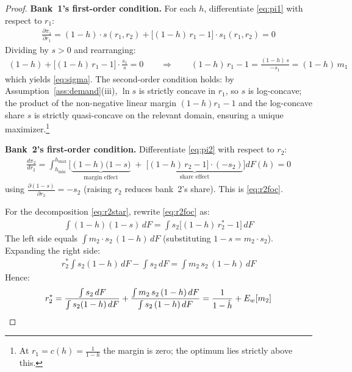 \documentclass[12pt]{article}
\theoremstyle{plain}
\theoremstyle{plain}
\theoremstyle{definition}  %
\theoremstyle{remark}  %
\begin{document}
\begin{proof}
\textbf{Bank~1's first-order condition.} For each $h$, differentiate \eqref{eq:pi1} with respect to $r_1$:
\begin{align*}
    \frac{\partial \pi_1}{\partial r_1} = (1-h) \cdot s(r_1, r_2) + \big[(1-h)\,r_1 - 1\big] \cdot s_1(r_1, r_2) = 0
\end{align*}
Dividing by $s > 0$ and rearranging:
\begin{align*}
    (1-h) + \big[(1-h)\,r_1 - 1\big] \cdot \frac{s_1}{s} = 0 \qquad\Longrightarrow\qquad (1-h)\,r_1 - 1 = \frac{(1-h)\, s}{-s_1} = (1-h)\, m_1
\end{align*}
which yields \eqref{eq:sigma}. The second-order condition holds: by Assumption~\ref{ass:demand}(iii), $\ln s$ is strictly concave in $r_1$, so $s$ is log-concave; the product of the non-negative linear margin $(1-h)r_1 - 1$ and the log-concave share $s$ is strictly quasi-concave on the relevant domain, ensuring a unique maximizer.\footnote{At $r_1 = c(h) = \frac{1}{1-h}$ the margin is zero; the optimum lies strictly above this.}

\medskip\noindent
\textbf{Bank~2's first-order condition.} Differentiate \eqref{eq:pi2} with respect to $r_2$:
\begin{align*}
    \frac{d\pi_2}{dr_2} = \int_{h_{\min}}^{h_{\max}} \bigg[\underbrace{(1-h)\big(1-s\big)}_{\text{margin effect}} \;+\; \underbrace{\big[(1-h)\,r_2 - 1\big]\cdot(-s_2)}_{\text{share effect}}\bigg] dF(h) = 0
\end{align*}
using $\frac{\partial(1-s)}{\partial r_2} = -s_2$ (raising $r_2$ reduces bank~2's share). This is \eqref{eq:r2foc}.

\medskip\noindent
For the decomposition \eqref{eq:r2star}, rewrite \eqref{eq:r2foc} as:
\begin{align*}
    \int (1-h)(1-s)\, dF = \int s_2 \big[(1-h)\,r_2^* - 1\big]\, dF
\end{align*}
The left side equals $\int m_2 \cdot s_2 \,(1-h)\, dF$ (substituting $1-s = m_2 \cdot s_2$). Expanding the right side:
\begin{align*}
    r_2^* \int s_2(1-h)\, dF - \int s_2\, dF = \int m_2\, s_2\,(1-h)\, dF
\end{align*}
Hence:
\begin{align*}
    r_2^* = \frac{\int s_2\, dF}{\int s_2(1-h)\, dF} + \frac{\int m_2\, s_2\,(1-h)\, dF}{\int s_2\,(1-h)\, dF} = \frac{1}{1 - \hat{h}} + E_w[m_2] \qedhere
\end{align*}
\end{proof}
\end{document}
